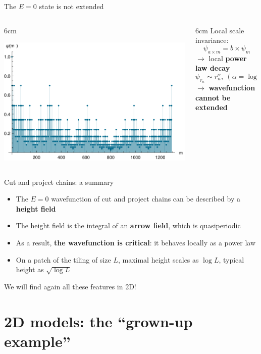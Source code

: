 \documentclass[xcolor=x11names,compress,professionalfonts]{beamer}
\renewcommand{\(}{\begin{columns}}
\renewcommand{\)}{\end{columns}}
\newcommand{\<}[1]{\begin{column}{#1}}
\renewcommand{\>}{\end{column}}
\begin{document}
\begin{frame}{The $E=0$ state is not extended}
{

\centering

}

\begin{columns}
\<{6cm}
{\centering
\includegraphics[scale=.5]{img/wavefunction.pdf}

}
\>

\<{6cm}
Local scale invariance:
\[
	\psi_{a \times m} = b \times \psi_{m} 
\]
$\rightarrow$ local \textbf{power law decay}
\[
\psi_{r_n} \sim r_n^\alpha, ~(\alpha = \log b/\log a)
\]
$\rightarrow$ \textbf{wavefunction cannot be extended}
\>
\end{columns}

\end{frame}

\begin{frame}{Cut and project chains: a summary}
\begin{itemize}
	\item The $E=0$ wavefunction of cut and project chains can be described by a \textbf{height field}
	\item The height field is the integral of an \textbf{arrow field}, which is quasiperiodic
	\item As a result, \textbf{the wavefunction is critical}: it behaves locally as a power law
	\item On a patch of the tiling of size $L$, maximal height scales as $\log L$, typical height as $\sqrt{\log L}$
\end{itemize}
We will find again all these features in 2D!
\end{frame}

\section{2D models: the ``grown-up example''}
\end{document}
